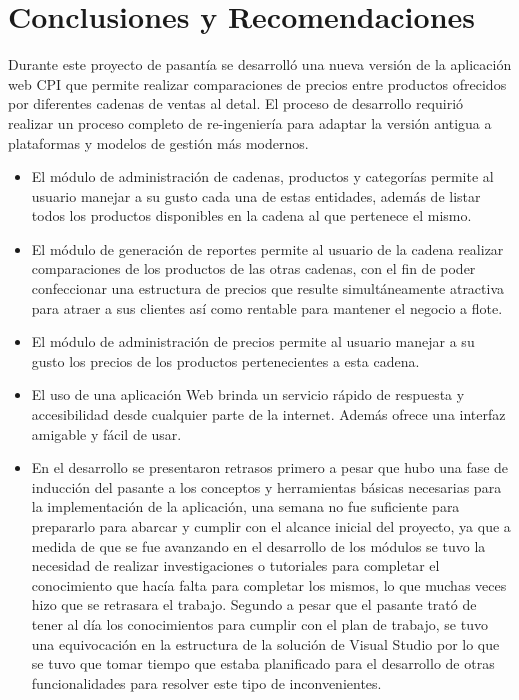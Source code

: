 \chapter*{Conclusiones y Recomendaciones}
Durante este proyecto de pasantía se desarrolló una nueva versión de la aplicación web CPI que permite realizar comparaciones de precios entre productos ofrecidos por diferentes cadenas de ventas al detal. El proceso de desarrollo requirió realizar un proceso completo de re-ingeniería para adaptar la versión antigua a plataformas y modelos de gestión más modernos.

\begin{itemize}
	\item El módulo de administración de cadenas, productos y categorías permite al usuario manejar a su gusto cada una de estas entidades, además de listar todos los productos disponibles en la cadena al que pertenece el mismo.
	\item El módulo de generación de reportes permite al usuario de la cadena realizar comparaciones de los productos de las otras cadenas, con el fin de poder confeccionar una estructura de precios que resulte simultáneamente atractiva para atraer a sus clientes así como rentable para mantener el negocio a flote. 
	\item El módulo de administración de precios permite al usuario manejar a su gusto los precios de los productos pertenecientes a esta cadena.
	\item El uso de una aplicación Web brinda un servicio rápido de respuesta y accesibilidad desde cualquier parte de la internet. Además ofrece una interfaz amigable y fácil de usar.
	\item En el desarrollo se presentaron retrasos primero a pesar que hubo una fase de inducción del pasante a los conceptos y herramientas básicas necesarias para la implementación de la aplicación, una semana no fue suficiente para prepararlo para abarcar y cumplir con el alcance inicial del proyecto, ya que a medida de que se fue avanzando en el desarrollo de los módulos se tuvo la necesidad de realizar investigaciones o tutoriales para completar el conocimiento que hacía falta para completar los mismos, lo que muchas veces hizo que se retrasara el trabajo. Segundo a pesar que el pasante trató de tener al día los conocimientos para cumplir con el plan de trabajo, se tuvo una equivocación en la estructura de la solución de Visual Studio por lo que se tuvo que tomar tiempo que estaba planificado para el desarrollo de otras funcionalidades para resolver este tipo de inconvenientes.

\end{itemize}
